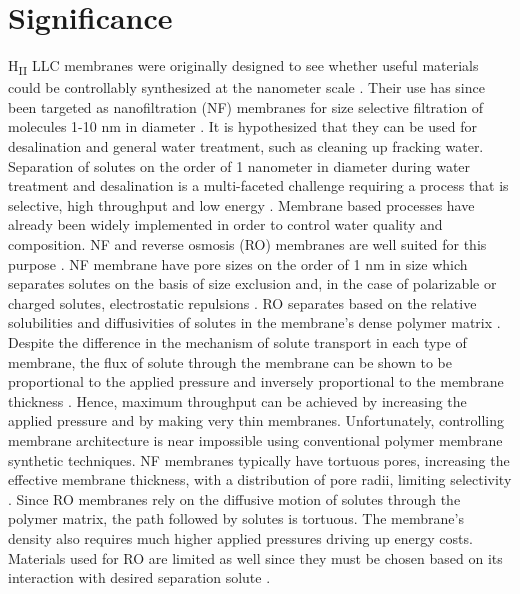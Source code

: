 \documentclass[12pt]{article}
\begin{document}
\section{Significance}
H\textsubscript{II} LLC membranes were originally designed to see whether useful materials could be controllably synthesized at the nanometer scale \cite{smith_ordered_1997}. Their use has since been targeted as nanofiltration (NF) membranes for size selective filtration of molecules 1-10 nm in diameter \cite{zhou_supported_2005}. It is hypothesized that they can be used for desalination \cite{feng_scalable_2014} and general water treatment, such as cleaning up fracking water. Separation of solutes on the order of 1 nanometer in diameter during water treatment and desalination is a multi-faceted challenge requiring a process that is selective, high throughput and low energy \cite{daily_population_1992}. Membrane based processes have already been widely implemented in order to control water quality and composition. NF and reverse osmosis (RO) membranes are well suited for this purpose \cite{lee_review_2011, greenlee_reverse_2009, humplik_nanostructured_2011}. NF membrane have pore sizes on the order of 1 nm in size which separates solutes on the basis of size exclusion and, in the case of polarizable or charged solutes, electrostatic repulsions  \cite{humplik_nanostructured_2011}. RO separates based on the relative solubilities and diffusivities of solutes in the membrane’s dense polymer matrix \cite{wijmans_solution-diffusion_1995}. Despite the difference in the mechanism of solute transport in each type of membrane, the flux of solute through the membrane can be shown to be proportional to the applied pressure and inversely proportional to the membrane thickness \cite{wijmans_solution-diffusion_1995}. Hence, maximum throughput can be achieved by increasing the applied pressure and by making very thin membranes. Unfortunately, controlling membrane architecture is near impossible using conventional polymer membrane synthetic techniques. NF membranes typically have tortuous pores, increasing the effective membrane thickness, with a distribution of pore radii, limiting selectivity \cite{lau_recent_2012}. Since RO membranes rely on the diffusive motion of solutes through the polymer matrix, the path followed by solutes is tortuous. The membrane’s density also requires much higher applied pressures driving up energy costs. Materials used for RO are limited as well since they must be chosen based on its interaction with desired separation solute \cite{fritzmann_state---art_2007}.
\end{document}
